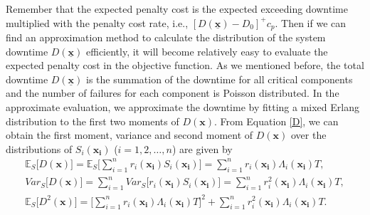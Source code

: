 \documentclass[preprint,12pt]{elsarticle}
\begin{document}
Remember that the expected penalty cost is the expected exceeding downtime multiplied with the penalty cost rate, i.e., $[D(\underline{\boldsymbol{x}})-D_0]^{+}c_p$. Then if we can find an approximation method to calculate the distribution of the system downtime $D(\underline{\boldsymbol{x}})$ efficiently, it will become relatively easy to evaluate the expected penalty cost in the objective function.
As we mentioned before, the total downtime $D(\underline{\boldsymbol{x}})$ is the summation of the downtime for all critical components and the number of failures for each component is Poisson distributed. In the approximate evaluation, we approximate the downtime by fitting a mixed Erlang distribution to the first two moments of $D(\boldsymbol{x})$. From Equation \eqref{D}, we can obtain the first moment, variance and second moment of $D(\boldsymbol{x})$ over the distributions of $S_{i}(\boldsymbol{x_{i}})$ ($i=1,2,\dots,n$) are given by
\begin{eqnarray}
\mathbb{E}_{S}\bigg[D(\boldsymbol{x})\bigg]=\mathbb{E}_{S}\bigg[\sum_{i=1}^{n}{r_{i}(\boldsymbol{x_{i}})S_{i}(\boldsymbol{x_{i}})}\bigg]=\sum_{i=1}^{n}{r_{i}(\boldsymbol{x_{i}})\Lambda_{i}(\boldsymbol{x_{i}})T},
\label{ED1}\\
Var_{S}\bigg[D(\boldsymbol{x})\bigg]=\sum_{i=1}^{n}{Var_{S}\bigg[{r_{i}(\boldsymbol{x_{i}})S_{i}(\boldsymbol{x_{i}})}\bigg]}=\sum_{i=1}^{n}{r_{i}^{2}(\boldsymbol{x_{i}})\Lambda_{i}(\boldsymbol{x_{i}})T},
\label{VD1}\\
\mathbb{E}_{S}\bigg[D^{2}(\boldsymbol{x}) \bigg]= \bigg[\sum_{i=1}^{n}{r_{i}(\boldsymbol{x_{i}})\Lambda_{i}(\boldsymbol{x_{i}})T}\bigg]^{2} + \sum_{i=1}^{n}{r_{i}^{2}(\boldsymbol{x_{i}})\Lambda_{i}(\boldsymbol{x_{i}})T}.
\end{eqnarray}
\end{document}
